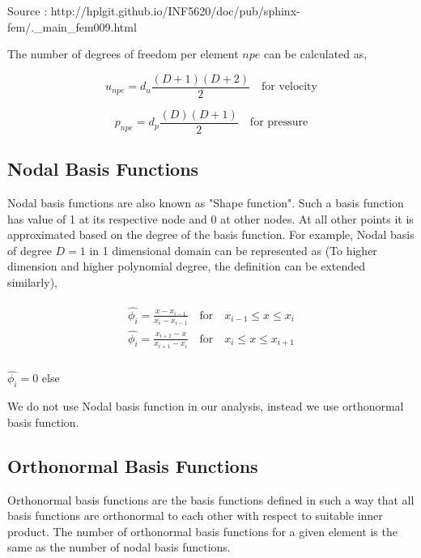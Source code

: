 \documentclass[a4paper]{book}
\begin{document}
Source : http://hplgit.github.io/INF5620/doc/pub/sphinx-fem/.\_main\_fem009.html 
\newpage

The number of degrees of freedom per element $npe$ can be calculated as,

\begin{equation} \label{unpe}
u_{npe} = d_u \frac{(D+1)(D+2)}{2} \quad \textrm{for velocity}
\end{equation} 

\begin{equation} \label{pnpe}
p_{npe} = d_p \frac{(D)(D+1)}{2} \quad \textrm{for pressure}
\end{equation} 


\subsection{Nodal Basis Functions}

Nodal basis functions are also known as "Shape function". Such a basis function has value of 1 at its respective node and 0 at other nodes. At all other points it is approximated based on the degree of the basis function. 
For example, Nodal basis of degree $D=1$ in 1 dimensional domain can be represented as (To higher dimension and higher polynomial degree, the definition can be extended similarly),

\begin{equation}
\begin{aligned}
\begin{split}
\hat{\phi_i} = \frac{x-x_{i-1}}{x_i-x_{i-1}} \quad \textrm{for} \quad x_{i-1} \leq x \leq x_i\\
\hat{\phi_i} = \frac{x_{i+1}-x}{x_{i+1}-x_{i}} \quad \textrm{for} \quad x_{i} \leq x \leq x_{i+1}\\
\end{split}
\end{aligned}
\end{equation}
\begin{center}
$\hat{\phi_i} = 0$ else
\end{center}

We do not use Nodal basis function in our analysis, instead we use orthonormal basis function.

\subsection{Orthonormal Basis Functions}

Orthonormal basis functions are the basis functions defined in such a way that all basis functions are orthonormal to each other with respect to suitable inner product. The number of orthonormal basis functions for a given element is the same as the number of nodal basis functions. 
\end{document}
